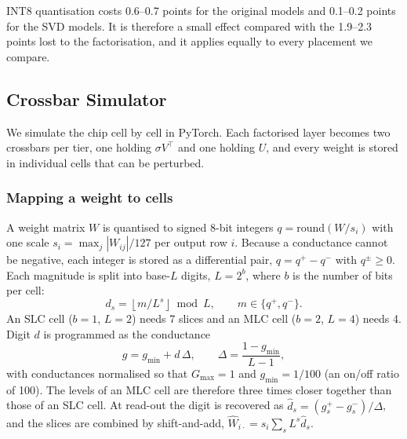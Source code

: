 \documentclass[conference]{IEEEtran}
\begin{document}
INT8 quantisation costs 0.6--0.7 points for the original models and 0.1--0.2 points for the SVD models.
It is therefore a small effect compared with the 1.9--2.3 points lost to the factorisation, and it applies
equally to every placement we compare.

\subsection{Crossbar Simulator}
We simulate the chip cell by cell in PyTorch. Each factorised layer becomes two crossbars per tier, one
holding $\sigma V^{\top}$ and one holding $U$, and every weight is stored in individual cells that can be
perturbed.

\subsubsection{Mapping a weight to cells}
A weight matrix $W$ is quantised to signed 8-bit integers $q = \mathrm{round}(W/s_i)$ with one scale
$s_i=\max_j|W_{ij}|/127$ per output row $i$. Because a conductance cannot be negative, each integer is
stored as a differential pair, $q=q^{+}-q^{-}$ with $q^{\pm}\ge0$. Each magnitude is split into base-$L$
digits, $L=2^{b}$, where $b$ is the number of bits per cell:
\begin{equation}
d_s = \left\lfloor m/L^{s}\right\rfloor \bmod L, \qquad m\in\{q^{+},q^{-}\}.
\end{equation}
An SLC cell ($b=1$, $L=2$) needs 7 slices and an MLC cell ($b=2$, $L=4$) needs 4. Digit $d$ is programmed as
the conductance
\begin{equation}
g = g_{\min} + d\,\Delta, \qquad \Delta=\frac{1-g_{\min}}{L-1},
\end{equation}
with conductances normalised so that $G_{\max}=1$ and $g_{\min}=1/100$ (an on/off ratio of 100). The
levels of an MLC cell are therefore three times closer together than those of an SLC cell. At read-out the
digit is recovered as $\hat d_s=(g^{+}_s-g^{-}_s)/\Delta$, and the slices are combined by shift-and-add,
$\hat W_{i\cdot}=s_i\sum_s L^{s}\hat d_s$.
\end{document}
